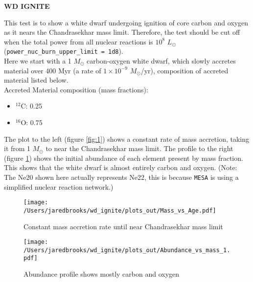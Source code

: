 \documentclass{article}
\begin{document}
	
	\begin{center}
		\begin{Large}
		       \textbf{WD IGNITE}\\
		\end{Large}
	\end{center}
	

        This test is to show a white dwarf undergoing ignition of core carbon and oxygen as it nears the Chandrasekhar mass limit.  Therefore, the test should be cut off when the total power from all nuclear reactions is $10^8$ $L_\odot$ (\texttt{power\_nuc\_burn\_u\-pper\_limit = 1d8}).\\

	Here we start with a 1 $M_\odot$ carbon-oxygen white dwarf, which slowly accretes material over 400 Myr (a rate of $1\times10^{-9}$ $M_\odot$/yr), composition of accreted material listed below.\\

	\noindent Accreted Material composition (mass fractions):
        \begin{itemize}
        \item $^{12}$C: 0.25
        \item $^{16}$O: 0.75
        \end{itemize}

        The plot to the left (figure \ref{fig:1}) shows a constant rate of mass accretion, taking it from 1 $M_\odot$ to near the Chandrasekhar mass limit.  The profile to the right (figure \ref{fig:2}) shows the initial abundance of each element present by mass fraction.  This shows that the white dwarf is almost entirely carbon and oxygen.  (Note: The Ne20 shown here actually represents Ne22, this is because \texttt{MESA} is using a simplified nuclear reaction network.)

	\begin{figure}[H]
          \begin{minipage}[b]{0.5\linewidth}
	    \centering
	    \texttt{[image: /Users/jaredbrooks/wd\_ignite/plots\_out/Mass\_vs\_Age.pdf]}
	    \caption{Constant mass accretion rate until near Chandrasekhar mass limit}
	    \label{fig:1}
          \end{minipage}
          \hspace{0cm}
          \begin{minipage}[b]{0.5\linewidth}
            \centering
            \texttt{[image: /Users/jaredbrooks/wd\_ignite/plots\_out/Abundance\_vs\_mass\_1.pdf]}
            \caption{Abundance profile shows mostly carbon and oxygen}
            \label{fig:2}
          \end{minipage}
	\end{figure}
\end{document}
